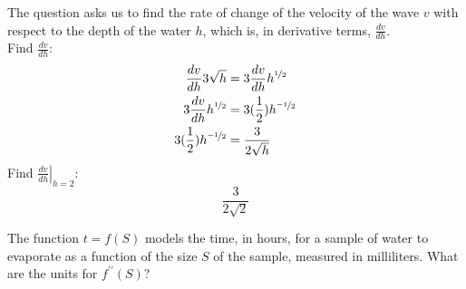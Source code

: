 \documentclass[12pt,letterpaper, onecolumn]{exam}
\newcommand\at[2]{\left.#1\right|_{#2}}
\begin{document}
\begin{questions}

	\begin{solution}
		The  question asks us to find the rate of change of the velocity of the wave $v$ with respect to the depth of the water $h$, which is, in derivative terms, $\frac{dv}{dh}$. \\
		Find $\frac{dv}{dh}$:
		\begin{align*}
			\frac{dv}{dh} 3\sqrt{h} & = 3 \frac{dv}{dh} h^{\nicefrac{1}{2}} \\
			3 \frac{dv}{dh} h^{\nicefrac{1}{2}} & = 3 (\frac{1}{2}) h^{\nicefrac{-1}{2}} \\
			3 (\frac{1}{2}) h^{\nicefrac{-1}{2}} & = \frac{3}{2\sqrt{h}}
		\end{align*}
		Find $\at{\frac{dv}{dh}}{h=2}$:
			$$\boxed{\frac{3}{2\sqrt{2}}}$$
	\end{solution}

\pagebreak

\question The function $t=f(S)$ models the time, in hours, for a sample of water to evaporate as a function of the size $S$ of the sample, measured in milliliters. What are the units for $f^{\prime\prime}(S)$?
\end{questions}
\end{document}
